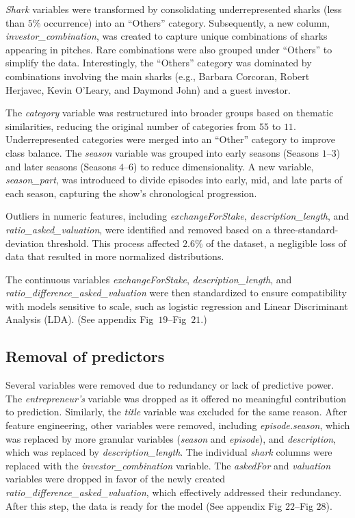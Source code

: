 \documentclass{article}
\begin{document}
\textit{Shark} variables were transformed by consolidating underrepresented sharks (less than $5\%$ occurrence) into an ``Others'' category. Subsequently, a new column, \textit{investor\_combination}, was created to capture unique combinations of sharks appearing in pitches. Rare combinations were also grouped under ``Others'' to simplify the data. Interestingly, the ``Others'' category was dominated by combinations involving the main sharks (e.g., Barbara Corcoran, Robert Herjavec, Kevin O’Leary, and Daymond John) and a guest investor.

The \textit{category} variable was restructured into broader groups based on thematic similarities, reducing the original number of categories from $55$ to $11$. Underrepresented categories were merged into an ``Other'' category to improve class balance. The \textit{season} variable was grouped into early seasons (Seasons $1$–$3$) and later seasons (Seasons $4$–$6$) to reduce dimensionality. A new variable, \textit{season\_part}, was introduced to divide episodes into early, mid, and late parts of each season, capturing the show’s chronological progression.

Outliers in numeric features, including \textit{exchange\-For\-Stake}, 
\textit{description\_length}, and \textit{ratio\_asked\_valuation}, were identified 
and removed based on a three-standard-deviation threshold. This process affected 
$2.6\allowbreak\%$ of the dataset, a negligible loss of data that resulted in more normalized 
distributions.

The continuous variables \textit{exchange\-For\-Stake}, \textit{description\_length}, and 
\textit{ratio\_difference\_asked\_valuation} were then standardized to ensure compatibility 
with models sensitive to scale, such as logistic regression and Linear Discriminant Analysis 
(LDA). (See appendix Fig~$19$–Fig~$21$.)


\subsection{Removal of predictors}

Several variables were removed due to redundancy or lack of predictive power. The \textit{entrepreneur’s} variable was dropped as it offered no meaningful contribution to prediction. Similarly, the \textit{title} variable was excluded for the same reason. After feature engineering, other variables were removed, including \textit{episode.season}, which was replaced by more granular variables (\textit{season} and \textit{episode}), and \textit{description}, which was replaced by \textit{description\_length}. The individual \textit{shark} columns were replaced with the \textit{investor\_combination} variable. The \textit{askedFor} and \textit{valuation} variables were dropped in favor of the newly created \textit{ratio\_difference\_asked\_valuation}, which effectively addressed their redundancy. After this step, the data is ready for the model (See appendix Fig $22$–Fig $28$).
\end{document}

